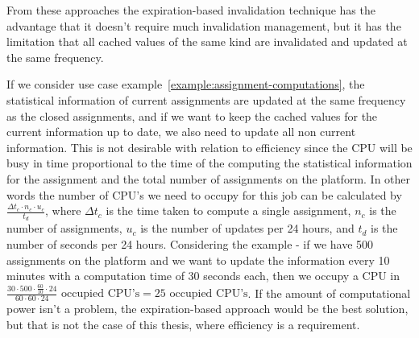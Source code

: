 From these approaches the expiration-based invalidation technique has the advantage that it doesn't require much invalidation management, but it has the limitation that all cached values of the same kind are invalidated and updated at the same frequency.

If we consider use case example~\ref{example:assignment-computations}, the statistical information of current assignments are updated at the same frequency as the closed assignments, and if we want to keep the cached values for the current information up to date, we also need to update all non current information. This is not desirable with relation to efficiency since the CPU will be busy in time proportional to the time of the computing the statistical information for the assignment and the total number of assignments on the platform. In other words the number of CPU's we need to occupy for this job can be calculated by $\frac{\Delta t_c \cdot n_c \cdot u_c}{t_d}$, where $\Delta t_c$ is the time taken to compute a single assignment, $n_c$ is the number of assignments, $u_c$ is the number of updates per 24 hours, and $t_d$ is the number of seconds per 24 hours. Considering the example - if we have 500 assignments on the platform and we want to update the information every 10 minutes with a computation time of 30 seconds each, then we occupy a CPU in $\frac{30 \cdot 500 \cdot \frac{60}{10} \cdot 24}{60 \cdot 60 \cdot 24}\text{ occupied CPU's} = 25\text{ occupied CPU's}$. If the amount of computational power isn't a problem, the expiration-based approach would be the best solution, but that is not the case of this thesis, where efficiency is a requirement.


